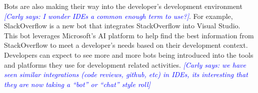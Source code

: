 \documentclass{sig-alternate}
\newcommand{\cl}[1]{\textcolor{blue}{{\it [Carly says: #1]}}}
\begin{document}
Bots are also making their way into the developer's development environment \cl{I wonder IDEs a common enough term to use?}. For example, SlackOverflow is a new bot that integrates StackOverflow into Visual Studio.  This bot leverages Microsoft's AI platform to help find the best information from StackOverflow to meet a developer's needs based on their development context. 
Developers can expect to see more and more bots being introduced into the tools and platforms they use for development related activities.  \cl{we have seen similar integrations (code reviews, github, etc) in IDEs, its interesting that they are now taking a ``bot'' or ``chat'' style roll}




%



%


%

\listoftodos
%
%
\end{document}
